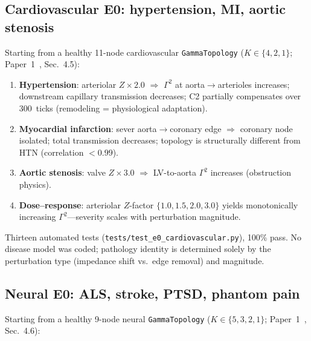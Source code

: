 \documentclass[aps,pre,twocolumn,superscriptaddress,floatfix]{revtex4-2}
\begin{document}
\subsection{Cardiovascular E0: hypertension, MI, aortic stenosis}

Starting from a healthy 11-node cardiovascular
\texttt{GammaTopology} ($K \in \{4, 2, 1\}$;
Paper~1~\cite{Paper1}, Sec.~4.5):

\begin{enumerate}
  \item \textbf{Hypertension}: arteriolar $Z \times 2.0$
    $\Rightarrow$ $\Gamma^2$ at aorta$\to$arterioles
    increases; downstream capillary transmission decreases;
    C2 partially compensates over 300~ticks
    (remodeling = physiological adaptation).
  \item \textbf{Myocardial infarction}: sever
    aorta$\to$coronary edge
    $\Rightarrow$ coronary node isolated;
    total transmission decreases; topology is structurally
    different from HTN (correlation $< 0.99$).
  \item \textbf{Aortic stenosis}: valve $Z \times 3.0$
    $\Rightarrow$ LV-to-aorta $\Gamma^2$ increases
    (obstruction physics).
  \item \textbf{Dose--response}: arteriolar $Z$-factor
    $\{1.0, 1.5, 2.0, 3.0\}$ yields monotonically
    increasing $\Gamma^2$---severity scales with perturbation
    magnitude.
\end{enumerate}

\noindent
Thirteen automated tests
(\texttt{tests/test\_e0\_cardiovascular.py}), 100\% pass.
No disease model was coded; pathology identity is
determined solely by the perturbation type
(impedance shift vs.\ edge removal) and magnitude.

\subsection{Neural E0: ALS, stroke, PTSD, phantom pain}

Starting from a healthy 9-node neural
\texttt{GammaTopology} ($K \in \{5, 3, 2, 1\}$;
Paper~1~\cite{Paper1}, Sec.~4.6):
\end{document}
